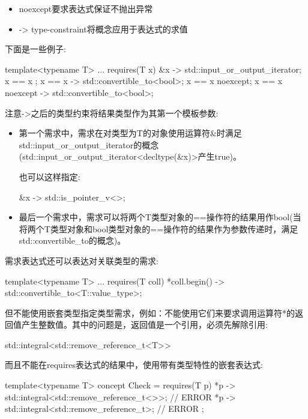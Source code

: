 \begin{itemize}
\item
noexcept要求表达式保证不抛出异常

\item
-> type-constraint将概念应用于表达式的求值
\end{itemize}

下面是一些例子:

\begin{cpp}
template<typename T>
... requires(T x) {
	{ &x } -> std::input_or_output_iterator;
	{ x == x };
	{ x == x } -> std::convertible_to<bool>;
	{ x == x }noexcept;
	{ x == x }noexcept -> std::convertible_to<bool>;
}
\end{cpp}

注意->之后的类型约束将结果类型作为其第一个模板参数:

\begin{itemize}
\item
第一个需求中，需求在对类型为T的对象使用运算符\&时满足std::input\_or\_output\_iterator的概念(std::input\_or\_output\_iterator<decltype(\&x)>产生true)。

也可以这样指定:

\begin{cpp}
{ &x } -> std::is_pointer_v<>;
\end{cpp}

\item
最后一个需求中，需求可以将两个T类型对象的==操作符的结果用作bool(当将两个T类型对象和bool类型对象的==操作符的结果作为参数传递时，满足std::convertible\_to的概念)。
\end{itemize}

需求表达式还可以表达对关联类型的需求:

\begin{cpp}
template<typename T>
... requires(T coll) {
	{ *coll.begin() } -> std::convertible_to<T::value_type>;
}
\end{cpp}

但不能使用嵌套类型指定类型需求，例如：不能使用它们来要求调用运算符*的返回值产生整数值。其中的问题是，返回值是一个引用，必须先解除引用:

\begin{cpp}
std::integral<std::remove_reference_t<T>>
\end{cpp}

而且不能在requires表达式的结果中，使用带有类型特性的嵌套表达式:

\begin{cpp}
template<typename T>
concept Check = requires(T p) {
	{ *p } -> std::integral<std::remove_reference_t<>>; // ERROR
	{ *p } -> std::integral<std::remove_reference_t>; // ERROR
};
\end{cpp}

